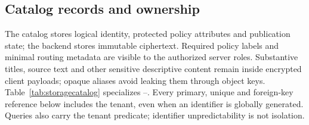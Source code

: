 \subsection{Catalog records and ownership}
The catalog stores logical identity, protected policy attributes and publication state; the backend stores immutable ciphertext. Required policy labels and minimal routing metadata are visible to the authorized server roles. Substantive titles, source text and other sensitive descriptive content remain inside encrypted client payloads; opaque aliases avoid leaking them through object keys. Table~\ref{tab:storagecatalog} specializes --. Every primary, unique and foreign-key reference below includes the tenant, even when an identifier is globally generated. Queries also carry the tenant predicate; identifier unpredictability is not isolation.
